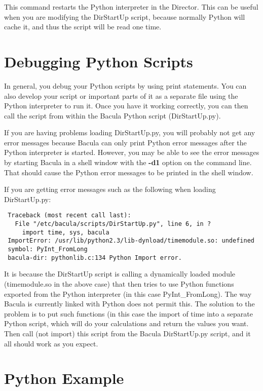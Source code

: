 This command restarts the Python interpreter in the Director.
This can be useful when you are modifying the DirStartUp script,
because normally Python will cache it, and thus the
script will be read one time.

\section{Debugging Python Scripts}
In general, you debug your Python scripts by using print statements.
You can also develop your script or important parts of it as a 
separate file using the Python interpreter to run it.  Once you
have it working correctly, you can then call the script from 
within the Bacula Python script (DirStartUp.py).

If you are having problems loading DirStartUp.py, you will probably
not get any error messages because Bacula can only print Python 
error messages after the Python interpreter is started.  However, you
may be able to see the error messages by starting Bacula in
a shell window with the {\bf -d1} option on the command line. That
should cause the Python error messages to be printed in the shell
window.

If you are getting error messages such as the following when 
loading DirStartUp.py:

\begin{verbatim}
 Traceback (most recent call last):
   File "/etc/bacula/scripts/DirStartUp.py", line 6, in ?
     import time, sys, bacula
 ImportError: /usr/lib/python2.3/lib-dynload/timemodule.so: undefined
 symbol: PyInt_FromLong
 bacula-dir: pythonlib.c:134 Python Import error.
\end{verbatim}
     
It is because the DirStartUp script is calling a dynamically loaded
module (timemodule.so in the above case) that then tries to use
Python functions exported from the Python interpreter (in this case
PyInt\_FromLong). The way Bacula is currently linked with Python does
not permit this.  The solution to the problem is to put such functions  
(in this case the import of time into a separate Python script, which
will do your calculations and return the values you want. Then call
(not import) this script from the Bacula DirStartUp.py script, and
it all should work as you expect.
   
                                    
           


\section{Python Example}

